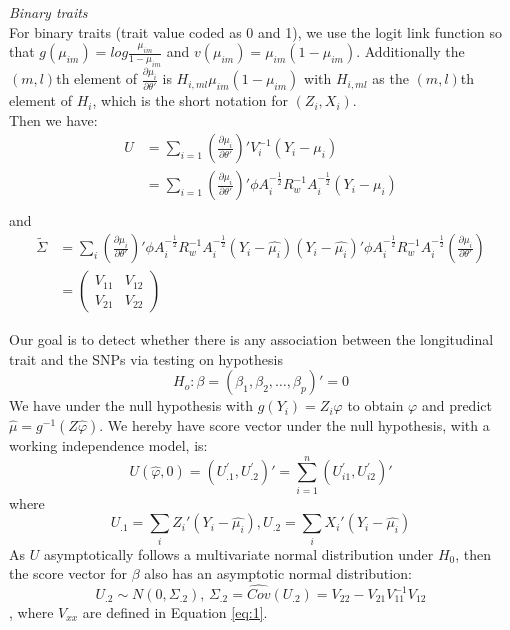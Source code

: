 \documentclass[compress]{beamer}
\begin{document}
{\framebreak
\textit{Binary traits}\\
\indent For binary traits (trait value coded as 0 and 1), we use the logit link function so that $g(\mu_{im}) = log \frac{\mu_{im}}{1 - \mu_{im}}$ and $v(\mu_{im}) = \mu_{im} (1 - \mu_{im})$. Additionally the $(m, l)$th element of $\frac{\partial\mu_{i}}{\partial\theta'}$ is
$
H_{i,ml} \mu_{im} (1- \mu_{im})
$
with $H_{i,ml}$ as the $(m, l)$th element of $H_i$, which is the short notation for $(Z_{i},X_{i})$.\\
Then we have:
\begin{align*}
U & = \sum_{i=1} (\frac{\partial\mu_{i}}{\partial\theta'})' V_i^{-1} (Y_{i}-\mu_{i})\\
& = \sum_{i=1} (\frac{\partial\mu_{i}}{\partial\theta'})' \phi A_{i}^{-\frac{1}{2}} R_{w}^{-1} A_{i}^{-\frac{1}{2}} (Y_{i}-\mu_{i})\\
\end{align*}
and
\begin{align*}
\widetilde{\Sigma} & = \sum_{i}\left(\frac{\partial\mu_{i}}{\partial\theta'}\right)' \phi A_{i}^{-\frac{1}{2}} R_{w}^{-1} A_{i}^{-\frac{1}{2}} (Y_{i}-\hat{\mu_{i}}) (Y_{i}-\hat{\mu_{i}})' \phi A_{i}^{-\frac{1}{2}} R_{w}^{-1} A_{i}^{-\frac{1}{2}} \left( \frac{\partial\mu_{i}}{\partial\theta'} \right)\\
& = 
\begin{pmatrix}
V_{11} & V_{12}\\
 V_{21} & V_{22}
\end{pmatrix}
\end{align*}
%


\framebreak
\scriptsize
Our goal is to detect whether there is any association between the longitudinal trait and the SNPs via testing on hypothesis 
$$H_{o}:\beta=(\beta_{1},\beta_{2},\ldots,\beta_{p})'=0$$ 
We have under the null hypothesis with $g(Y_i)=Z_i\varphi$ to obtain $\varphi$ and predict $\hat{\mu}=g^{-1}(Z\hat{\varphi})$. We hereby have score vector under the null hypothesis, with a working independence model, is:
$$U(\hat{\varphi},0)=(U_{.1}^{'}, U_{.2}^{'})'=\sum_{i=1}^{n}(U_{i1}^{'},U_{i2}^{'})'$$
where
$$U_{.1}=\sum_{i}Z_{i}'(Y_{i}-\hat{\mu_{i}}), U_{.2}=\sum_{i}X_{i}'(Y_{i}-\hat{\mu_{i}})$$ 
As $U$ asymptotically follows a multivariate normal distribution under $H_{0}$, then the score vector for $\beta$ also has an asymptotic normal distribution:\\
$$
U_{.2}\sim N(0,\Sigma_{.2}),\,\Sigma_{.2}= \widehat{Cov} (U_{.2}) = V_{22} - V_{21} V_{11}^{-1} V_{12}
$$, where $V_{xx}$ are defined in Equation \ref{eq:1}.

}
\end{document}
